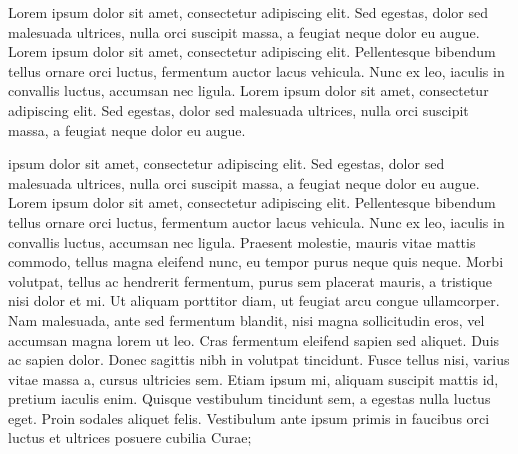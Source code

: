 \documentclass[a4paper]{article}
\begin{document}
Lorem ipsum dolor sit amet, consectetur adipiscing elit. Sed egestas, dolor sed malesuada ultrices, nulla orci suscipit massa, a feugiat neque dolor eu augue. Lorem ipsum dolor sit amet, consectetur adipiscing elit. Pellentesque bibendum tellus ornare orci luctus, fermentum auctor lacus vehicula. Nunc ex leo, iaculis in convallis luctus, accumsan nec ligula.
\beginnumbering
    \pstart
Lorem ipsum dolor sit amet, consectetur adipiscing elit. Sed egestas, dolor sed malesuada ultrices, nulla orci suscipit massa, a feugiat neque dolor eu augue. 

        \pend

        \endnumbering
\begin{pairs}\sloppy
\begin{Leftside} 
    \beginnumbering
               \pstart
{} ipsum  dolor sit amet, consectetur adipiscing elit. Sed   egestas, dolor sed malesuada ultrices, nulla orci  suscipit massa, a feugiat neque dolor eu augue.  Lorem ipsum dolor sit amet, consectetur adipiscing  elit. Pellentesque bibendum  tellus ornare orci luctus, fermentum auctor lacus vehicula. Nunc ex leo, iaculis in  convallis  luctus, accumsan nec ligula. Praesent molestie, mauris vitae mattis commodo, tellus magna  eleifend nunc, eu tempor purus neque quis neque. Morbi volutpat, tellus ac hendrerit fermentum, purus sem placerat mauris, a tristique nisi dolor et mi. Ut aliquam porttitor diam, ut  feugiat arcu congue ullamcorper. Nam malesuada, ante sed fermentum blandit, nisi magna sollicitudin eros, vel accumsan magna lorem ut leo. Cras fermentum eleifend sapien sed aliquet. Duis ac sapien dolor. Donec sagittis nibh in volutpat tincidunt. Fusce tellus nisi, varius vitae massa a, cursus ultricies sem. Etiam ipsum mi, aliquam suscipit mattis id, pretium iaculis enim. Quisque vestibulum tincidunt sem, a egestas nulla  luctus eget. Proin sodales aliquet felis.  Vestibulum ante ipsum primis in faucibus orci luctus et  ultrices posuere cubilia Curae;


\end{Leftside}
\end{pairs}
\end{document}
